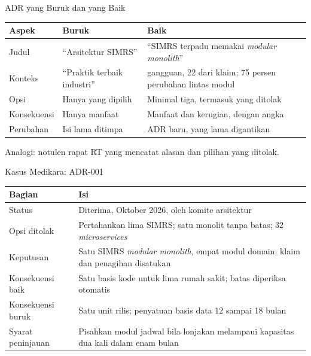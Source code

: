 \documentclass[aspectratio=169, table, 12pt]{beamer}
\begin{document}
\begin{frame}{{\Large ADR yang Buruk dan yang Baik}}
  \footnotesize
  \begin{tabularx}{\textwidth}{>{\raggedright\arraybackslash}p{2.2cm}
      >{\raggedright\arraybackslash}X >{\raggedright\arraybackslash}X}
    \hline
    \textbf{Aspek} & \textbf{Buruk} & \textbf{Baik} \\
    \hline
    Judul & ``Arsitektur SIMRS'' & ``SIMRS terpadu memakai \textit{modular monolith}'' \\
    \hline
    Konteks & ``Praktik terbaik industri'' & 63 gangguan, 22 dari klaim; 75 persen perubahan
      lintas modul \\
    \hline
    Opsi & Hanya yang dipilih & Minimal tiga, termasuk yang ditolak \\
    \hline
    Konsekuensi & Hanya manfaat & Manfaat dan kerugian, dengan angka \\
    \hline
    Perubahan & Isi lama ditimpa & ADR baru, yang lama digantikan \\
    \hline
  \end{tabularx}

  \vspace{6pt}
  \small Analogi: notulen rapat RT yang mencatat alasan dan pilihan yang ditolak.
\end{frame}

\begin{frame}{{\Large Kasus Medikara: ADR-001}}
  \footnotesize
  \begin{tabularx}{\textwidth}{>{\raggedright\arraybackslash}p{2.6cm}
      >{\raggedright\arraybackslash}X}
    \hline
    \textbf{Bagian} & \textbf{Isi} \\
    \hline
    Status & Diterima, Oktober 2026, oleh komite arsitektur \\
    \hline
    Opsi ditolak & Pertahankan lima SIMRS; satu monolit tanpa batas; 32 \textit{microservices} \\
    \hline
    Keputusan & Satu SIMRS \textit{modular monolith}, empat modul domain; klaim dan penagihan
      disatukan \\
    \hline
    Konsekuensi baik & Satu basis kode untuk lima rumah sakit; batas diperiksa otomatis \\
    \hline
    Konsekuensi buruk & Satu unit rilis; penyatuan basis data 12 sampai 18 bulan \\
    \hline
    Syarat peninjauan & Pisahkan modul jadwal bila lonjakan melampaui kapasitas dua kali dalam
      enam bulan \\
    \hline
  \end{tabularx}
\end{frame}
\end{document}
